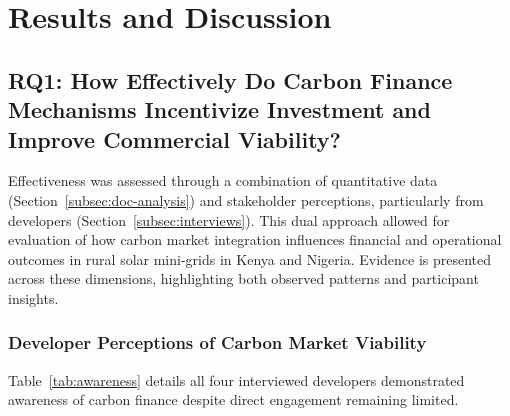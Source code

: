 \section{Results and Discussion}
\label{sec:results}

\subsection{RQ1: How Effectively Do Carbon Finance Mechanisms Incentivize Investment and Improve Commercial Viability?}
\label{subsec:rq1}
Effectiveness was assessed through a combination of quantitative data (Section~\ref{subsec:doc-analysis}) and stakeholder perceptions, particularly from developers (Section~\ref{subsec:interviews}). This dual approach allowed for evaluation of how carbon market integration influences financial and operational outcomes in rural solar mini-grids in Kenya and Nigeria. Evidence is presented across these dimensions, highlighting both observed patterns and participant insights.

\subsubsection{Developer Perceptions of Carbon Market Viability}
Table~\ref{tab:awareness} details all four interviewed developers demonstrated awareness of carbon finance despite direct engagement remaining limited.

\begin{table}[t]
	\centering
	\caption{Developer Awareness and Consideration of Carbon Finance.}
	\label{tab:awareness}
\end{table}

